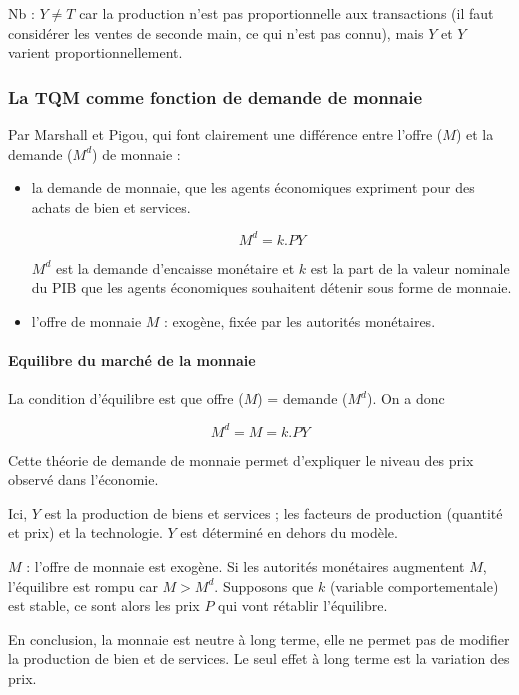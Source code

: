 	Nb : $Y \neq T$ car la production n'est pas proportionnelle aux transactions (il faut considérer les ventes de seconde main, ce qui n'est pas connu), mais $Y$ et $Y$ varient proportionnellement.
	
	
	\subsubsection{La TQM comme fonction de demande de monnaie}
	
	Par Marshall et Pigou, qui font clairement une différence entre l'offre ($M$) et la demande ($M^d$) de monnaie :
	
	\begin{itemize}
		\item la demande de monnaie, que les agents économiques expriment pour des achats de bien et services.
		
		$$M^d =k.PY$$
		
		$M^d$ est la demande d'encaisse monétaire et $k$ est la part de la valeur nominale du PIB que les agents économiques souhaitent détenir sous forme de monnaie.
		
		\item l'offre de monnaie $M$ : exogène, fixée par les autorités monétaires.
	\end{itemize}
	
	\paragraph{Equilibre du marché de la monnaie} La condition d'équilibre est que offre ($M$) = demande ($M^d$). On a donc 
	
	$$M^d = M = k.PY$$
	
	Cette théorie de demande de monnaie permet d'expliquer le niveau des prix observé dans l'économie.
	
	Ici, $Y$ est la production de biens et services ; les facteurs de production (quantité et prix) et la technologie. $Y$ est déterminé en dehors du modèle.
	
	$M$ : l'offre de monnaie est exogène. Si les autorités monétaires augmentent $M$, l'équilibre est rompu car $M > M^d$. Supposons que $k$ (variable comportementale) est stable, ce sont alors les prix $P$ qui vont rétablir l'équilibre.
	
	En conclusion, la monnaie est neutre à long terme, elle ne permet pas de modifier la production de bien et de services. Le seul effet à long terme est la variation des prix.
	
